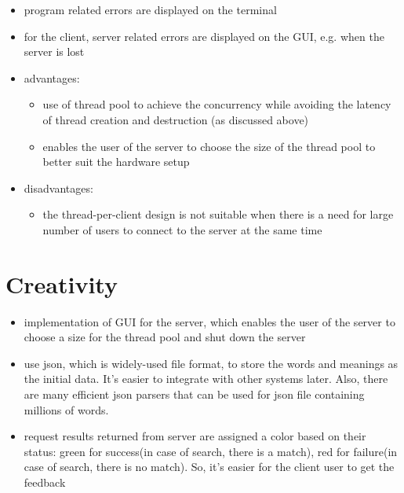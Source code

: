 \documentclass{article}
\begin{document}
\begin{itemize}
    \item program related errors are displayed on the terminal
    \item for the client, server related errors are displayed on the GUI, e.g. when the server is lost
    \item advantages:
    \begin{itemize}
        \item use of thread pool to achieve the concurrency while avoiding the latency of thread creation and destruction (as discussed above)
        \item enables the user of the server to choose the size of the thread pool to better suit the hardware setup
    \end{itemize} 
    \item disadvantages:
    \begin{itemize}
        \item the thread-per-client design is not suitable when there is a need for large number of users to connect to the server at the same time
    \end{itemize}
\end{itemize}

\section*{Creativity}

\begin{itemize}
    \item implementation of GUI for the server, which enables the user of the server to choose a size for the thread pool and shut down the server
    \item use json, which is widely-used file format, to store the words and meanings as the initial data. It's easier to integrate with other systems later. Also, there are many efficient json parsers that can be used for json file containing millions of words.
    \item request results returned from server are assigned a color based on their status: green for success(in case of search, there is a match), red for failure(in case of search, there is no match). So, it's easier for the client user to get the feedback
\end{itemize}
\end{document}
